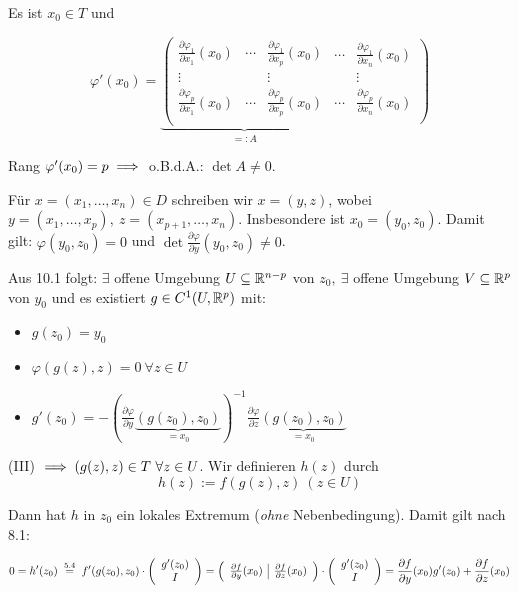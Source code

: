 \documentclass[a4paper,twoside,DIV15,BCOR12mm,chapterprefix=true,headings=twolinechapter]{scrbook}
\begin{document}
\begin{beweis}
Es ist $x_0 \in T$ und

$$\varphi'(x_0) = 
\underbrace{
\left(
\begin{array}{ccc|}
\frac{\partial \varphi_1}{\partial x_1}(x_0) & \cdots & \frac{\partial \varphi_1}{\partial x_p}(x_0)\\
\vdots &  & \vdots\\
\frac{\partial \varphi_p}{\partial x_1}(x_0) & \cdots & \frac{\partial \varphi_p}{\partial x_p}(x_0)\\
\end{array}
\right.
}_{=:A}
\left.
\begin{array}{cc}
\cdots & \frac{\partial \varphi_1}{\partial x_n}(x_0)\\
 & \vdots\\
\cdots & \frac{\partial \varphi_p}{\partial x_n}(x_0)\\
\end{array}
\right)$$

Rang $\varphi'(x_0) = p \implies$ o.B.d.A.: $\det A \ne 0.$

Für $x=(x_1,\ldots,x_n) \in D$ schreiben wir $x=(y,z)$, wobei $y=(x_1,\dots,x_p),\ z=(x_{p+1},\ldots,x_n).$ Insbesondere ist $x_0=(y_0,z_0)$. Damit gilt: $\varphi(y_0,z_0) = 0$ und $\det \frac{\partial \varphi}{\partial y}(y_0,z_0) \ne 0$.

Aus 10.1 folgt: $\exists$ offene Umgebung $U \subseteq \mathbb{R}^{n-p}$ von $z_0,\ \exists$ offene Umgebung $V \subseteq \mathbb{R}^p$ von $y_0$ und es existiert $g \in C^1(U,\mathbb{R}^p)$ mit:

\begin{itemize}
\item[(II)] $g(z_0)=y_0$
\item[(III)] $\varphi(g(z),z) = 0\ \forall z \in U$
\item[(IV)] $g'(z_0) = -(\frac{\partial \varphi}{\partial y}\underbrace{(g(z_0),z_0)}_{=x_0})^{-1}\frac{\partial \varphi}{\partial z}\underbrace{(g(z_0),z_0)}_{=x_0}$
\end{itemize}

(III) $\implies (g(z),z) \in T\ \forall z \in U$. Wir definieren $h(z)$ durch
$$h(z) := f(g(z),z)\ (z \in U)$$

Dann hat $h$ in $z_0$ ein lokales Extremum (\emph{ohne} Nebenbedingung). Damit gilt nach 8.1:

$$0=h'(z_0) \gleichnach{5.4} f'(g(z_0),z_0)\cdot\left(
\begin{array}{c}
g'(z_0)\\
I
\end{array}\right) = \left(
\begin{array}{c|c}
\frac{\partial f}{\partial y}(x_0) & \frac{\partial f}{\partial z}(x_0)
\end{array}\right) \cdot \left(
\begin{array}{c}
g'(z_0)\\
I
\end{array}\right) = \frac{\partial f}{\partial y}(x_0) g'(z_0) + \frac{\partial f}{\partial z}(x_0)$$


\end{beweis}
\end{document}
